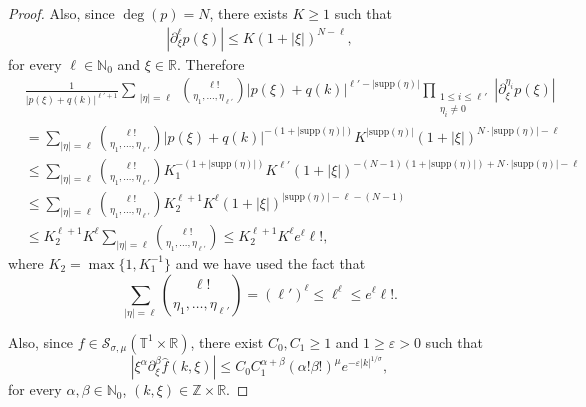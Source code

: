 \documentclass[11pt,reqno]{amsart}
\numberwithin{equation}{section}
\theoremstyle{definition}
\theoremstyle{definition}
\newcommand{\supp}{\text{supp}}
\newcommand{\T}{\mathbb{T}}
\newcommand{\G}{\mathnormal{\mathbb{T}^{m}\times\mathbb{R}^n}}
\newcommand{\R}{\mathbb{R}}
\newcommand{\Z}{\mathbb{Z}}
\newcommand{\N}{\mathbb{N}}
\newcommand{\s}{\mathcal{S}(\G)}
\renewcommand{\s}{\mathcal{S}_{\sigma,\mu}(\T^1\times\R)}
\begin{document}
\begin{proof}
        
 Also, since $\deg(p)=N$, there exists $K\geq 1$ such that     
    \begin{align*}
        |\partial_\xi^\ell p(\xi)|
        \leq 
            K(1+|\xi|)^{N-\ell},
    \end{align*}
     for every $\ell\in\N_0$ and $\xi\in\R$. Therefore
        \begin{align*}     
        &\frac{1}{|p(\xi)+q(k)|^{\ell'+1}}\sum_{\substack{|\eta|=\ell}}\binom{\ell!}{\eta_1,\dots,\eta_{\ell'}} |p(\xi)+q(k)|^{\ell'-|\supp(\eta)|}\prod_{\substack{1\leq i\leq \ell'\\\eta_i\neq 0 }}|\partial_\xi^{\eta_i}p(\xi)|\\
        &= \sum_{|\eta|=\ell}\binom{\ell!}{\eta_1,\dots,\eta_{\ell'}} |p(\xi)+q(k)|^{-(1+|\supp(\eta)|)}K^{|\supp(\eta)|}(1+|\xi|)^{N\cdot |\supp(\eta)|-\ell}\\
        &\leq\sum_{|\eta|=\ell}\binom{\ell!}{\eta_1,\dots,\eta_{\ell'}} K_1^{-(1+|\supp(\eta)|)}K^{\ell'}(1+|\xi|)^{-(N-1)(1+|\supp(\eta)|)+N\cdot |\supp(\eta)|-\ell}\\
      &\leq\sum_{|\eta|=\ell}\binom{\ell!}{\eta_1,\dots,\eta_{\ell'}}K_2^{\ell+1} K^\ell(1+|\xi|)^{|\supp(\eta)|-\ell-(N-1)}\\
         &\leq K_2^{\ell+1} K^\ell\sum_{|\eta|=\ell}\binom{\ell!}{\eta_1,\dots,\eta_{\ell'}}\leq K_2^{\ell+1} K^\ell e^\ell \ell!,
\end{align*}
where $K_2=\max\{1,K_1^{-1}\}$ and we have used the fact that
\[\sum_{|\eta|=\ell}\binom{\ell!}{\eta_1,\dots,\eta_{\ell'}} = (\ell')^\ell \leq \ell^\ell \leq e^\ell\ell!.\]

Also, since $f\in\s$, there exist $C_0,C_1\geq 1$ and $1\geq \varepsilon>0$ such that
    \begin{equation}\label{eq_estimates_f_2}     |\xi^\alpha\partial_\xi^\beta\widehat{f}(k,\xi)|\leq C_0C_1^{\alpha+\beta}(\alpha!\beta!)^\mu e^{-\varepsilon|k|^{1/\sigma}},
    \end{equation}  
    for every $\alpha,\beta\in\N_0$, $(k,\xi)\in\Z\times\R$.
    

\end{proof}
\end{document}
